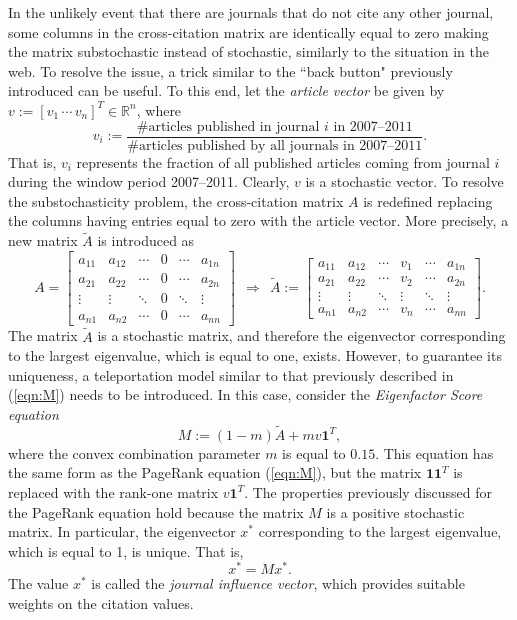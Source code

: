 \documentclass[11pt,draftcls,onecolumn]{IEEEtran}
\newcommand{\field}[1]{{\mathbb{#1}}}
\newcommand{\one}{\mathbf{1}}
\newcommand{\R}{\field{R}}
\begin{document}
In the unlikely event that there are journals that do not cite any other journal, 
some columns in the cross-citation matrix 
are identically 
equal to zero making the matrix substochastic instead of stochastic,
similarly to the situation in the web.
To resolve the issue, a trick similar to the ``back button" 
previously introduced can be useful.
To this end, let the {\it article vector} be given by
$v:= [v_1 \,\cdots\, v_n]^T\in\R^n$, where
$$
v_i := \frac{\mbox{\# articles published in journal $i$ in  2007--2011}}{\mbox{\# articles published by all journals in 2007--2011}}.
$$
That is, $v_i$ represents the fraction of all published articles coming from journal $i$ during 
the window period 2007--2011. Clearly, $v$ is a stochastic vector. To resolve the substochasticity problem, 
the cross-citation matrix $A$ is redefined replacing the columns having entries equal to zero with 
the article vector. More precisely, a new matrix $\tilde A$ is introduced as 
$$
A = \left[ 
\begin{array}{cccccc}
a_{11} & a_{12} & \cdots & 0 & \cdots & a_{1n} \\
a_{21} & a_{22} & \cdots & 0 & \cdots & a_{2n} \\
\vdots & \vdots & \ddots & 0 & \ddots & \vdots \\
a_{n1} & a_{n2} & \cdots & 0 & \cdots & a_{nn}
\end{array}
\right]~~
\Rightarrow~~ \tilde 
A := \left[ 
\begin{array}{cccccc}
a_{11} & a_{12} & \cdots & v_1 & \cdots & a_{1n} \\
a_{21} & a_{22} & \cdots & v_2 & \cdots & a_{2n} \\
\vdots & \vdots & \ddots & \vdots & \ddots & \vdots \\
a_{n1} & a_{n2} & \cdots & v_n & \cdots & a_{nn}
\end{array}
\right].
$$
The matrix $\tilde A$ is a stochastic matrix, and therefore the 
eigenvector corresponding to the largest eigenvalue, which is equal 
to one, exists. However, to guarantee its uniqueness, 
a teleportation model similar to that 
previously described in (\ref{eqn:M}) needs to be introduced.
In this case, consider the {\it Eigenfactor Score equation}
$$
M := (1-m) \tilde A + m v \mathbf{1}^T,
$$
where the convex combination parameter $m$ is equal to $0.15$. 
This equation has the same form 
as the PageRank equation (\ref{eqn:M}), but the matrix $\one \one^T$ is replaced with the rank-one matrix $v \one^T$. 
The properties previously discussed for the PageRank equation hold because the matrix $M$ is a positive 
stochastic matrix. In particular, the eigenvector $x^*$ corresponding to the largest eigenvalue, 
which is equal to 1, is unique. That is,
$$
x^* = M x^*.
$$
The value $x^*$ is called the {\it journal influence vector}, 
which provides suitable weights on the citation values. 
\end{document}
